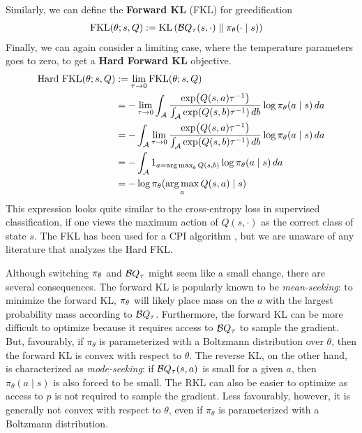 \documentclass[\main/thesis.tex]{subfiles}
\begin{document}
Similarly, we can define the \textbf{Forward KL} (FKL) for greedification %
\begin{align}
\text{FKL}(\theta; s, {Q}) &:= 
    \mathrm{KL}\left(\mathcal{B}Q_\tau(s, \cdot)  \parallel \pi_\theta(\cdot \mid s) \right)\nonumber
\end{align}
Finally, we can again consider a limiting case, where the temperature parameters goes to zero, to get a \textbf{Hard Forward KL} objective.
%
\begin{align*}
  \text{Hard FKL}(\theta; s, {Q}) &:=  \lim_{\tau \to 0} \text{FKL}(\theta; s, {Q}) \\
  &= -\lim_{\tau \to 0}\int_{\mathcal{A}} \frac{\exp(Q(s, a)\tau^{-1})}{\int_{\mathcal{A}} \exp(Q(s, b)\tau^{-1}) \, db} \log \pi_\theta(a \mid s) \, da\\
    &= -\int_{\mathcal{A}} \lim_{\tau \to 0} \frac{\exp(Q(s, a)\tau^{-1})}{\int_{\mathcal{A}} \exp(Q(s, b)\tau^{-1}) \, db} \log \pi_\theta(a \mid s) \, da \\
    &= -\int_{\mathcal{A}} 1_{a = \operatorname*{arg\,max}_b Q(s, b)} \log \pi_\theta(a \mid s) \, da \\
    &= -\log \pi_\theta(\operatorname*{arg\,max}_a Q(s, a) \mid s) 
\end{align*}
%
This expression looks quite similar to the cross-entropy loss in supervised classification, if one views the maximum action of $Q(s, \cdot)$ as the correct class of state $s$. The FKL has been used for a CPI algorithm \citep{vieillard2019deep}, but we are unaware of any literature that analyzes the Hard FKL. %

Although switching $\pi_\theta$ and $\mathcal{B}Q_\tau$ might seem like a small change, there are several consequences. The forward KL is popularly known to be \textit{mean-seeking}: to minimize the forward KL, $\pi_\theta$ will likely place mass on the $a$ with the largest probability mass according to $\mathcal{B}Q_\tau$. Furthermore, the forward KL can be more difficult to optimize because it requires access to $\mathcal{B}Q_\tau$ to sample the gradient. But, favourably, if $\pi_\theta$ is parameterized with a Boltzmann distribution over $\theta$, then the forward KL is convex with respect to $\theta$. The reverse KL, on the other hand, is characterized as \textit{mode-seeking}: if $\mathcal{B}Q_\tau(s, a)$ is small for a given $a$, then $\pi_\theta(a \mid s)$ is also forced to be small. The RKL can also be easier to optimize as access to $p$ is not required to sample the gradient. Less favourably, however, it is generally not convex with respect to $\theta$, even if $\pi_\theta$ is parameterized with a Boltzmann distribution. 
\end{document}
